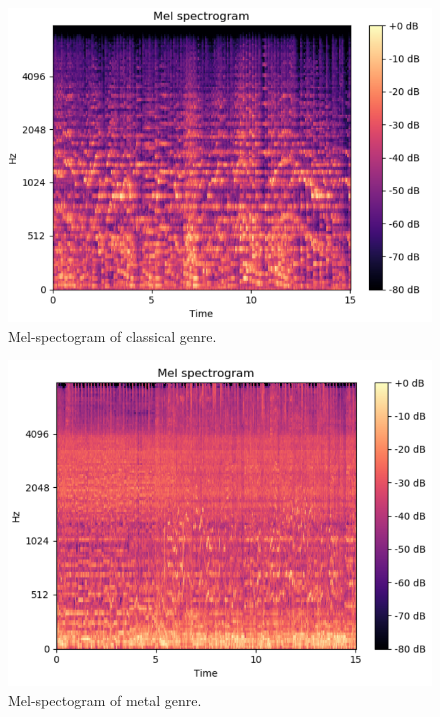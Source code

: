 \begin{figure}
\begin{center}
\includegraphics[scale=0.2]{./figures/classical.png}
\end{center}
\caption
{
Mel-spectogram of classical genre.
}
\label{fig:big_picture1}
\end{figure}

\begin{figure}
\begin{center}
\includegraphics[scale=0.2]{./figures/metal.png}
\end{center}
\caption
{
Mel-spectogram of metal genre.
}
\label{fig:big_picture2}
\end{figure}

